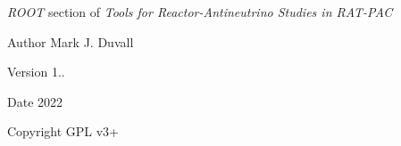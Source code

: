 {\itshape R\+O\+OT} section of {\itshape Tools for Reactor-\/\+Antineutrino Studies in R\+A\+T-\/\+P\+AC}

\begin{DoxyAuthor}{Author}
Mark J. Duvall 
\end{DoxyAuthor}
\begin{DoxyVersion}{Version}
1.. 
\end{DoxyVersion}
\begin{DoxyDate}{Date}
2022 
\end{DoxyDate}
\begin{DoxyCopyright}{Copyright}
G\+PL v3+ 
\end{DoxyCopyright}
